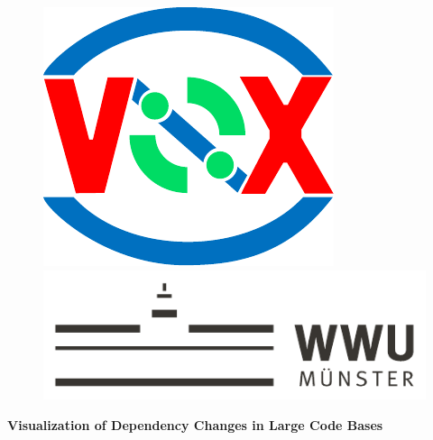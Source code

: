 \begin{centering}
\begin{figure}[!tbp]
  \centering
  \begin{minipage}[b]{0.15\textwidth}
    \includegraphics[width=\textwidth]{./figures/visix-logo.pdf}
  \end{minipage}
  \hfill
  \begin{minipage}[b]{0.5\textwidth}
    \includegraphics[width=\textwidth]{./figures/wwu-logo-neu.pdf}
  \end{minipage}
  \hfill
\end{figure}

\vspace*{\fill}

{\LARGE
	\textbf{Visualization of Dependency Changes in Large Code Bases}\\[1cm]
}


\end{centering}
